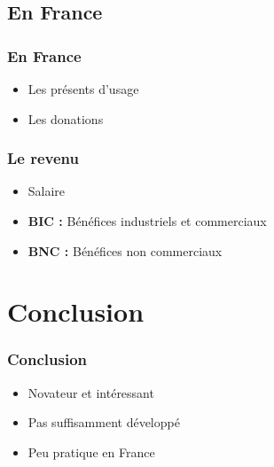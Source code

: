     \subsection{En France}


\begin{frame}
\frametitle{En France}

\begin{itemize}
    \itemsep1.5em
    \item Les présents d'usage
    \item Les donations
\end{itemize}
\end{frame}


\begin{frame}
\frametitle{Le revenu}

\begin{itemize}
    \itemsep1.5em
    \item Salaire
    \item \textbf{BIC :} Bénéfices industriels et commerciaux
    \item \textbf{BNC :} Bénéfices non commerciaux
\end{itemize}
\end{frame}


    \section{Conclusion}


\begin{frame}
\frametitle{Conclusion}
\begin{itemize}
    \itemsep1.5em
    \item Novateur et intéressant
    \item Pas suffisamment développé
    \item Peu pratique en France
\end{itemize}
\end{frame}
